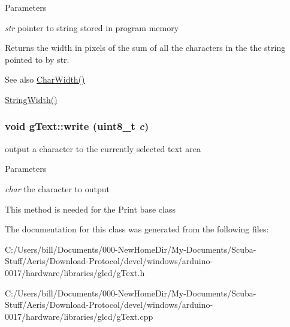 \begin{DoxyParams}{Parameters}
\item[{\em str}]pointer to string stored in program memory\end{DoxyParams}
\begin{DoxyReturn}{Returns}
the width in pixels of the sum of all the characters in the the string pointed to by str.
\end{DoxyReturn}
\begin{DoxySeeAlso}{See also}
\hyperlink{classg_text_a6cb49e22a690752ea439e2773ae31ec1}{CharWidth()} 

\hyperlink{classg_text_a0dce9ad4c40e0d8b0487f4d2303bd8ef}{StringWidth()} 
\end{DoxySeeAlso}
\hypertarget{classg_text_a7f537bfce982c46779f61321df66b018}{
\subsubsection[{write}]{\setlength{\rightskip}{0pt plus 5cm}void gText::write (uint8\_\-t {\em c})}}
\label{classg_text_a7f537bfce982c46779f61321df66b018}
output a character to the currently selected text area 
\begin{DoxyParams}{Parameters}
\item[{\em char}]the character to output\end{DoxyParams}
This method is needed for the Print base class 

The documentation for this class was generated from the following files:\begin{DoxyCompactItemize}
\item 
C:/Users/bill/Documents/000-\/NewHomeDir/My-\/Documents/Scuba-\/Stuff/Aeris/Download-\/Protocol/devel/windows/arduino-\/0017/hardware/libraries/glcd/gText.h\item 
C:/Users/bill/Documents/000-\/NewHomeDir/My-\/Documents/Scuba-\/Stuff/Aeris/Download-\/Protocol/devel/windows/arduino-\/0017/hardware/libraries/glcd/gText.cpp\end{DoxyCompactItemize}
